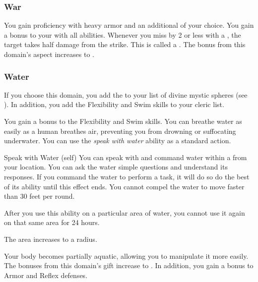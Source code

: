         \subsubsection{War}
             You gain proficiency with heavy armor and an additional  of your choice.
             You gain a  bonus to your  with all abilities.
             Whenever you miss by 2 or less with a , the target takes half damage from the strike.
            This is called a .
             The bonus from this domain's aspect increases to .

        \subsubsection{Water}
            If you choose this domain, you add the   to your list of divine mystic spheres (see ).
            In addition, you add the Flexibility and Swim skills to your cleric  list.

             You gain a  bonus to the Flexibility and Swim skills.
             You can breathe water as easily as a human breathes air, preventing you from drowning or suffocating underwater.
             You can use the \textit{speak with water} ability as a standard action.
            \begin{attuneability}{Speak with Water}
                 (self)
                \rankline
                You can speak with and command water within a \areahuge {} from your location.
                You can ask the water simple questions and understand its responses.
                If you command the water to perform a task, it will do so do the best of its ability until this effect ends.
                You cannot compel the water to move faster than 30 feet per round.

                After you use this ability on a particular area of water, you cannot use it again on that same area for 24 hours.

                \rankline
                 The area increases to a \areagarg radius.
            \end{attuneability}
             Your body becomes partially aquatic, allowing you to manipulate it more easily.
            The bonuses from this domain's gift increase to .
            In addition, you gain a  bonus to Armor and Reflex defenses.

